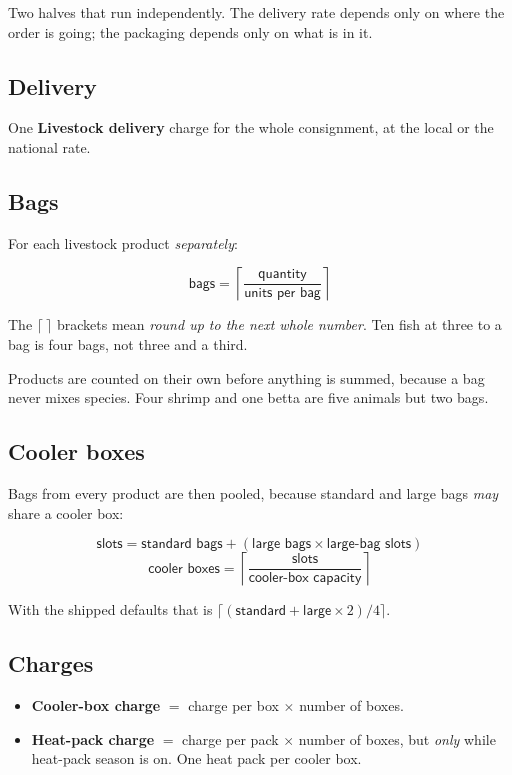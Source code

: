 \documentclass[11pt,a4paper,oneside]{report}
\begin{document}
Two halves that run independently. The delivery rate depends only on where the order
is going; the packaging depends only on what is in it.

\subsection{Delivery}

One \textbf{Livestock delivery} charge for the whole consignment, at the local or the
national rate.

\subsection{Bags}

For each livestock product \emph{separately}:

\[
\textsf{bags} = \left\lceil \frac{\textsf{quantity}}{\textsf{units per bag}} \right\rceil
\]

The $\lceil\ \rceil$ brackets mean \emph{round up to the next whole number}. Ten fish
at three to a bag is four bags, not three and a third.

Products are counted on their own before anything is summed, because a bag never
mixes species. Four shrimp and one betta are five animals but two bags.

\subsection{Cooler boxes}

Bags from every product are then pooled, because standard and large bags \emph{may}
share a cooler box:

\[
\textsf{slots} = \textsf{standard bags} + (\textsf{large bags} \times \textsf{large-bag slots})
\]
\[
\textsf{cooler boxes} = \left\lceil \frac{\textsf{slots}}{\textsf{cooler-box capacity}} \right\rceil
\]

With the shipped defaults that is $\lceil (\textsf{standard} + \textsf{large} \times
2) / 4 \rceil$.

\subsection{Charges}

\begin{itemize}
  \item \textbf{Cooler-box charge} $=$ charge per box $\times$ number of boxes.
  \item \textbf{Heat-pack charge} $=$ charge per pack $\times$ number of boxes, but
        \emph{only} while heat-pack season is on. One heat pack per cooler box.
\end{itemize}
\end{document}
